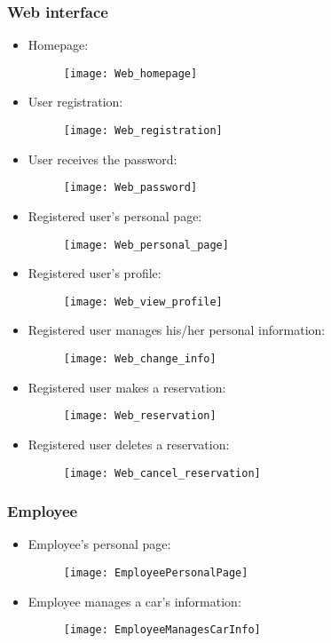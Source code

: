 \subsubsection{Web interface}
\begin{itemize}
	\item Homepage: 
	\begin{figure}[H]
		\centering
		\texttt{[image: Web\_homepage]}
	\end{figure}
\newpage
\item User registration:
\begin{figure}[H]
	\centering
	\texttt{[image: Web\_registration]}
\end{figure}
\newpage
\item User receives the password:
\begin{figure}[H]
	\centering
	\texttt{[image: Web\_password]}
\end{figure}
\newpage
\item Registered user's personal page:
\begin{figure}[H]
	\centering
	\texttt{[image: Web\_personal\_page]}
\end{figure}
\newpage
\item Registered user's profile:
\begin{figure}[H]
	\centering
	\texttt{[image: Web\_view\_profile]}
\end{figure}
\newpage
\item Registered user manages his/her personal information:
\begin{figure}[H]
	\centering
	\texttt{[image: Web\_change\_info]}
\end{figure}
\newpage
\item Registered user makes a reservation:
\begin{figure}[H]
	\centering
	\texttt{[image: Web\_reservation]}
\end{figure}
\newpage
\item Registered user deletes a reservation:
\begin{figure}[H]
	\centering
	\texttt{[image: Web\_cancel\_reservation]}
\end{figure}
\end{itemize}
\newpage
\subsubsection{Employee}
\begin{itemize}
	\item Employee's personal page:
	\begin{figure}[H]
		\centering
		\texttt{[image: EmployeePersonalPage]}
	\end{figure}
	\newpage
	\item Employee manages a car's information:
	\begin{figure}[H]
		\centering
		\texttt{[image: EmployeeManagesCarInfo]}
	\end{figure}
\end{itemize}
\newpage
